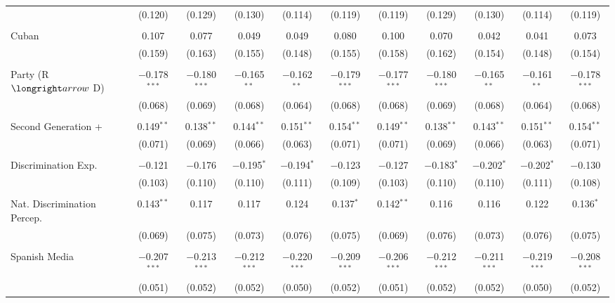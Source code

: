 \begin{table}[!htbp]
\begin{tabular}{@{\extracolsep{5pt}}lcccccccccc}
  & (0.120) & (0.129) & (0.130) & (0.114) & (0.119) & (0.119) & (0.129) & (0.130) & (0.114) & (0.119) \\ 
  & & & & & & & & & & \\ 
 Cuban & 0.107 & 0.077 & 0.049 & 0.049 & 0.080 & 0.100 & 0.070 & 0.042 & 0.041 & 0.073 \\ 
  & (0.159) & (0.163) & (0.155) & (0.148) & (0.155) & (0.158) & (0.162) & (0.154) & (0.148) & (0.154) \\ 
  & & & & & & & & & & \\ 
 Party (R $\longright arrow$ D) & $-$0.178$^{***}$ & $-$0.180$^{***}$ & $-$0.165$^{**}$ & $-$0.162$^{**}$ & $-$0.179$^{***}$ & $-$0.177$^{***}$ & $-$0.180$^{***}$ & $-$0.165$^{**}$ & $-$0.161$^{**}$ & $-$0.178$^{***}$ \\ 
  & (0.068) & (0.069) & (0.068) & (0.064) & (0.068) & (0.068) & (0.069) & (0.068) & (0.064) & (0.068) \\ 
  & & & & & & & & & & \\ 
 Second Generation + & 0.149$^{**}$ & 0.138$^{**}$ & 0.144$^{**}$ & 0.151$^{**}$ & 0.154$^{**}$ & 0.149$^{**}$ & 0.138$^{**}$ & 0.143$^{**}$ & 0.151$^{**}$ & 0.154$^{**}$ \\ 
  & (0.071) & (0.069) & (0.066) & (0.063) & (0.071) & (0.071) & (0.069) & (0.066) & (0.063) & (0.071) \\ 
  & & & & & & & & & & \\ 
 Discrimination Exp. & $-$0.121 & $-$0.176 & $-$0.195$^{*}$ & $-$0.194$^{*}$ & $-$0.123 & $-$0.127 & $-$0.183$^{*}$ & $-$0.202$^{*}$ & $-$0.202$^{*}$ & $-$0.130 \\ 
  & (0.103) & (0.110) & (0.110) & (0.111) & (0.109) & (0.103) & (0.110) & (0.110) & (0.111) & (0.108) \\ 
  & & & & & & & & & & \\ 
 Nat. Discrimination Percep. & 0.143$^{**}$ & 0.117 & 0.117 & 0.124 & 0.137$^{*}$ & 0.142$^{**}$ & 0.116 & 0.116 & 0.122 & 0.136$^{*}$ \\ 
  & (0.069) & (0.075) & (0.073) & (0.076) & (0.075) & (0.069) & (0.076) & (0.073) & (0.076) & (0.075) \\ 
  & & & & & & & & & & \\ 
 Spanish Media & $-$0.207$^{***}$ & $-$0.213$^{***}$ & $-$0.212$^{***}$ & $-$0.220$^{***}$ & $-$0.209$^{***}$ & $-$0.206$^{***}$ & $-$0.212$^{***}$ & $-$0.211$^{***}$ & $-$0.219$^{***}$ & $-$0.208$^{***}$ \\ 
  & (0.051) & (0.052) & (0.052) & (0.050) & (0.052) & (0.051) & (0.052) & (0.052) & (0.050) & (0.052) \\ 

\end{tabular}
\end{table}
